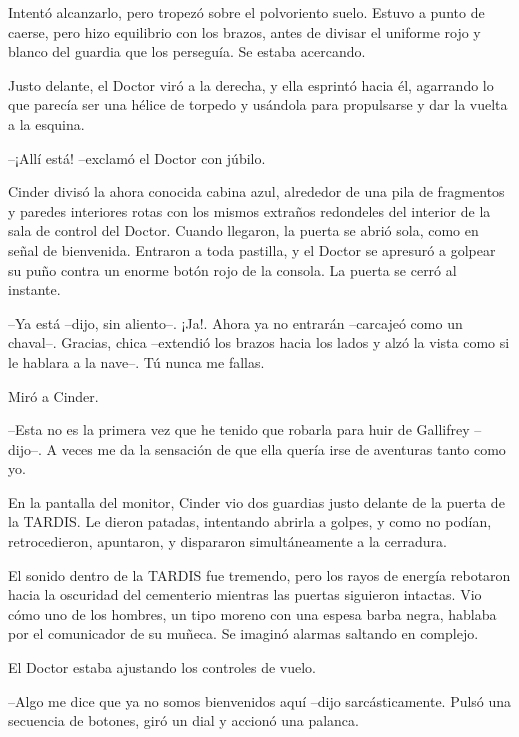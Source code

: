 Intentó alcanzarlo, pero tropezó sobre el polvoriento suelo. Estuvo a punto de caerse, pero hizo equilibrio con los brazos, antes de divisar el uniforme rojo y blanco del guardia que los perseguía. Se estaba acercando.

Justo delante, el Doctor viró a la derecha, y ella esprintó hacia él, agarrando lo que parecía ser una hélice de torpedo y usándola para propulsarse y dar la vuelta a la esquina.



--¡Allí está! --exclamó el Doctor con júbilo.



Cinder divisó la ahora conocida cabina azul, alrededor de una pila de fragmentos y paredes interiores rotas con los mismos extraños redondeles del interior de la sala de control del Doctor. Cuando llegaron, la puerta se abrió sola, como en señal de bienvenida. Entraron a toda pastilla, y el Doctor se apresuró a golpear su puño contra un enorme botón rojo de la consola. La puerta se cerró al instante.



--Ya está --dijo, sin aliento--. ¡Ja!. Ahora ya no entrarán --carcajeó como un chaval--. Gracias, chica --extendió los brazos hacia los lados y alzó la vista como si le hablara a la nave--. Tú nunca me fallas.



Miró a Cinder.



--Esta no es la primera vez que he tenido que robarla para huir de Gallifrey --dijo--. A veces me da la sensación de que ella quería irse de aventuras tanto como yo.

En la pantalla del monitor, Cinder vio dos guardias justo delante de la puerta de la TARDIS. Le dieron patadas, intentando abrirla a golpes, y como no podían, retrocedieron, apuntaron, y dispararon simultáneamente a la cerradura.

El sonido dentro de la TARDIS fue tremendo, pero los rayos de energía rebotaron hacia la oscuridad del cementerio mientras las puertas siguieron intactas. Vio cómo uno de los hombres, un tipo moreno con una espesa barba negra, hablaba por el comunicador de su muñeca.  Se imaginó alarmas saltando en complejo.

El Doctor estaba ajustando los controles de vuelo.



--Algo me dice que ya no somos bienvenidos aquí --dijo sarcásticamente. Pulsó una secuencia de botones, giró un dial y accionó una palanca.



